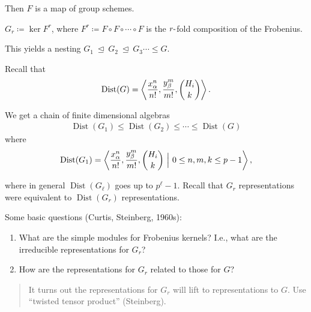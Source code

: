 Then \(F\) is a map of group schemes.

\begin{definition}

\(G_r \coloneqq\ker F^r\), where
\(F^r \coloneqq F\circ F \circ \cdots \circ F\) is the
\(r{\hbox{-}}\)fold composition of the Frobenius.

This yields a nesting
\(G_1 {~\trianglelefteq~}G_2 {~\trianglelefteq~}G_3 \cdots \leq G\).

\end{definition}

Recall that
\begin{align*}  
\operatorname{Dist}(G) = \left\langle{ {x_\alpha^n \over n!}, {y_\beta^m \over m!}, {H_i \choose k} }\right\rangle
.\end{align*}

We get a chain of finite dimensional algebras
\begin{align*}  
\operatorname{Dist}(G_1) \leq \operatorname{Dist}(G_2) \leq \cdots \leq \operatorname{Dist}(G)
\end{align*}
where
\begin{align*}  
\operatorname{Dist}(G_1) = \left\langle{ {x_\alpha^n \over n!}, {y_\beta^m \over m!}, {H_i \choose k} {~\mathrel{\Big|}~}0\leq n,m,k \leq p-1 }\right\rangle
,\end{align*}

where in general \(\operatorname{Dist}(G_\ell)\) goes up to
\(p^{\ell} - 1\). Recall that \(G_r\) representations were equivalent to
\(\operatorname{Dist}(G_r)\) representations.

Some basic questions (Curtis, Steinberg, 1960s):

\begin{enumerate}
\def\labelenumi{\arabic{enumi}.}
\item
  What are the simple modules for Frobenius kernels? I.e., what are the
  irreducible representations for \(G_r\)?
\item
  How are the representations for \(G_r\) related to those for \(G\)?
\end{enumerate}

\begin{quote}
It turns out the representations for \(G_r\) will lift to
representations to \(G\). Use ``twisted tensor product'' (Steinberg).
\end{quote}

